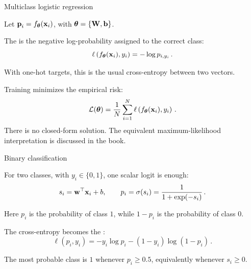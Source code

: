 \documentclass[12pt,aspectratio=169]{beamer}
\begin{document}
\begin{frame}{Multiclass logistic regression}

	\justifying
	\small
	Let $\boldsymbol{\mathbf{p}}_i=f_{\boldsymbol{\theta}}(\boldsymbol{\mathbf{x}}_i)$, with $\boldsymbol{\theta}=\{\boldsymbol{\mathbf{W}},\boldsymbol{\mathbf{b}}\}$.
	\begin{tcolorbox}[nndsblue]
		The  is the negative log-probability assigned to the correct class:
		\begin{equation}
			\ell\left(f_{\boldsymbol{\theta}}(\boldsymbol{\mathbf{x}}_i),y_i\right)
			=-\log p_{i,y_i} \,.
		\end{equation}
	\end{tcolorbox}

	With one-hot targets, this is the usual cross-entropy between two vectors.

	Training minimizes the empirical risk:
	\begin{equation}
		\mathcal{L}(\boldsymbol{\theta})
		=\frac{1}{N}\sum_{i=1}^{N}
		\ell\left(f_{\boldsymbol{\theta}}(\boldsymbol{\mathbf{x}}_i),y_i\right) \,.
	\end{equation}
	There is no closed-form solution. The equivalent maximum-likelihood interpretation is discussed in the book.

\end{frame}

\begin{frame}{Binary classification}

	\justifying
	\begin{tcolorbox}[nndsblue,boxsep=1mm,top=1mm,bottom=1mm]
		For two classes, with $y_i\in\{0,1\}$, one scalar logit is enough:
		\begin{equation}
			s_i=\boldsymbol{\mathbf{w}}^{\top}\boldsymbol{\mathbf{x}}_i+b,
			\qquad
			p_i=\sigma(s_i)=\frac{1}{1+\exp(-s_i)} \,.
		\end{equation}
	\end{tcolorbox}
	Here $p_i$ is the probability of class $1$, while $1-p_i$ is the probability of class $0$.

	\begin{tcolorbox}[nndsgreen]
		The cross-entropy becomes the :
		\begin{equation}
			\ell(p_i,y_i)
			=-y_i\log p_i-(1-y_i)\log(1-p_i) \,.
		\end{equation}
	\end{tcolorbox}

	The most probable class is $1$ whenever $p_i\geq 0.5$, equivalently whenever $s_i\geq 0$.

\end{frame}
\end{document}
